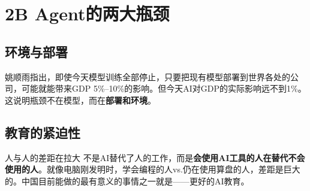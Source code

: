 \section{2B Agent的两大瓶颈}

\subsection{环境与部署}

姚顺雨指出，即使今天模型训练全部停止，只要把现有模型部署到世界各处的公司，可能就能带来GDP 5\%--10\%的影响。但今天AI对GDP的实际影响远不到1\%。这说明瓶颈不在模型，而在\textbf{部署和环境}。

\subsection{教育的紧迫性}

\begin{importantbox}{人与人的差距在拉大}
不是AI替代了人的工作，而是\textbf{会使用AI工具的人在替代不会使用的人}。就像电脑刚发明时，学会编程的人vs.仍在使用算盘的人，差距是巨大的。中国目前能做的最有意义的事情之一就是——更好的AI教育。
\end{importantbox}


